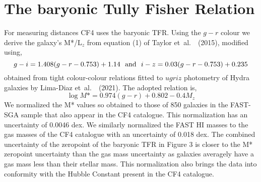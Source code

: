 \documentclass{article}
\newcommand{\etal}{\mbox{\rm{et al.}~~}}
\begin{document}
\section{The baryonic Tully Fisher Relation}
For measuring distances CF4 uses the baryonic TFR. Using the $g-r$ colour we derive
the galaxy's M*/L$_z$ from equation (1) of Taylor \etal (2015), modified using,$$
g-i = 1.408 (g-r -0.753)  + 1.14 {\rm ~~and~~} i-z = 0.03 (g-r -0.753) + 0.235$$ obtained from tight colour-colour relations fitted to $ugriz$ photometry of Hydra galaxies by Lima-Diaz \etal (2021). The adopted relation is, $$\log M* = 0.974 (g-r) + 0.802 -0.4 M_z$$ We normalized the M* values so obtained to those of 850 galaxies in the FAST-SGA sample that also appear in the CF4 catalogue. This normalization has an uncertainty of 0.0046 dex. We similarly normalized the FAST HI masses to the gas masses of the CF4 catalogue with an uncertainty of 0.018 dex. The combined uncertainty of the zeropoint of the baryonic TFR in Figure 3 is closer to the M* zeropoint uncertainty than the gas mass  uncertainty as galaxies averagely have a  gas mass less than their stellar mass. This normalization also brings the data into conformity with the Hubble Constant present in the CF4 catalogue.
\end{document}
